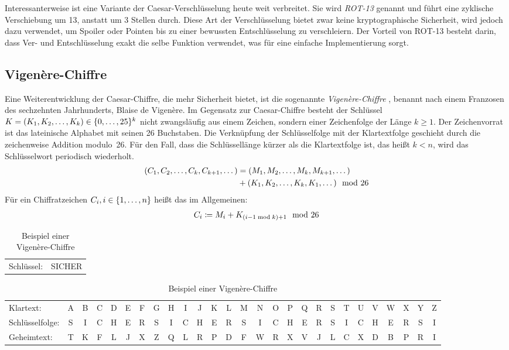 Interessanterweise ist eine Variante der Caesar-Verschlüsselung heute weit verbreitet. Sie wird \emph{ROT-13} \indexCaesarROT genannt und führt eine zyklische Verschiebung
um 13, anstatt um 3 Stellen durch. Diese Art der Verschlüsselung bietet zwar keine kryptographische Sicherheit, wird jedoch dazu verwendet, um Spoiler oder Pointen bis zu einer bewussten Entschlüsselung zu verschleiern. Der Vorteil von ROT-13 besteht darin, dass Ver- und
Entschlüsselung exakt die selbe Funktion verwendet, was für eine einfache Implementierung sorgt.

\subsection{Vigenère-Chiffre}
\label{ssec:vigenere}
Eine Weiterentwicklung der Caesar-Chiffre, die mehr Sicherheit bietet, ist die sogenannte \emph{Vigenère-Chiffre} \indexVignere, benannt nach einem Franzosen des
sechzehnten Jahrhunderts, Blaise de Vigenère. Im Gegensatz zur Caesar-Chiffre besteht der Schlüssel $K = (K_{1},K_{2},\dots,K_{k}) \in \{0,\dots,25\}^{k}$ nicht zwangsläufig aus einem Zeichen, sondern einer Zeichenfolge der Länge $k \geq 1$.
Der Zeichenvorrat ist das lateinische Alphabet mit seinen 26 Buchstaben. Die Verknüpfung der Schlüsselfolge mit der Klartextfolge geschieht durch die zeichenweise Addition modulo~26. Für den Fall, dass die Schlüssellänge kürzer als die Klartextfolge ist, das heißt $k < n$, wird das Schlüsselwort periodisch wiederholt.
\begin{align*}
	\begin{split}
		(C_{1},C_{2},\dots,C_{k},C_{k+1},\dots) &= (M_{1},M_{2},\dots,M_{k},M_{k+1},\dots)\\ 
		&+ (K_{1},K_{2},\dots,K_{k},K_{1},\dots) \mod 26
	\end{split}
\end{align*}
Für ein Chiffratzeichen $C_{i}, i \in \{1,\dots,n\}$ heißt das im Allgemeinen:
\begin{align*}
	C_{i} \coloneqq M_{i} + K_{(i-1 \bmod k)+1} \mod 26
\end{align*}

\begin{table}[h]
	\centering
	\setlength{\tabcolsep}{2pt}
	\begin{tabular}{ll}
		Schlüssel: 
		& SICHER
	\end{tabular}
	\begin{tabular}{l*{26}{c}}
		Klartext:
		&A&B&C&D&E&F&G&H&I&J&K&L&M&N&O&P&Q&R&S&T&U&V&W&X&Y&Z\\
		Schlüsselfolge:
		&S&I&C&H&E&R&S&I&C&H&E&R&S&I&C&H&E&R&S&I&C&H&E&R&S&I\\
		Geheimtext:
		&T&K&F&L&J&X&Z&Q&L&R&P&D&F&W&R&X&V&J&L&C&X&D&B&P&R&I\\
	\end{tabular}
	\caption{Beispiel einer Vigenère-Chiffre}
\end{table}

